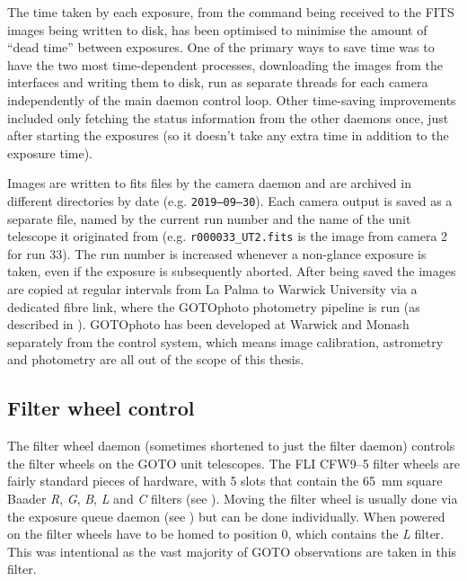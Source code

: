 \begin{colsection}
\begin{colsection}
The time taken by each exposure, from the command being received to the FITS images being written to disk, has been optimised to minimise the amount of ``dead time'' between exposures. One of the primary ways to save time was to have the two most time-dependent processes, downloading the images from the interfaces and writing them to disk, run as separate threads for each camera independently of the main daemon control loop. Other time-saving improvements included only fetching the status information from the other daemons once, just after starting the exposures (so it doesn't take any extra time in addition to the exposure time).

Images are written to \gls{fits} files by the camera daemon and are archived in different directories by date (e.g. \texttt{2019--09--30}). Each camera output is saved as a separate file, named by the current run number and the name of the unit telescope it originated from (e.g. \texttt{r000033\_UT2.fits} is the image from camera 2 for run 33). The run number is increased whenever a non-glance exposure is taken, even if the exposure is subsequently aborted. After being saved the images are copied at regular intervals from La Palma to Warwick University via a dedicated fibre link, where the GOTOphoto photometry pipeline is run (as described in ). GOTOphoto has been developed at Warwick and Monash separately from the control system, which means image calibration, astrometry and photometry are all out of the scope of this thesis.

\end{colsection}


\subsection{Filter wheel control}
\label{sec:filt}
\begin{colsection}

The filter wheel daemon (sometimes shortened to just the filter daemon) controls the filter wheels on the GOTO unit telescopes. The FLI CFW9--5 filter wheels are fairly standard pieces of hardware, with 5 slots that contain the \SI{65}{\milli\metre} square Baader \textit{R}, \textit{G}, \textit{B}, \textit{L} and \textit{C} filters (see ). Moving the filter wheel is usually done via the exposure queue daemon (see ) but can be done individually. When powered on the filter wheels have to be homed to position 0, which contains the \textit{L} filter. This was intentional as the vast majority of GOTO observations are taken in this filter.


\end{colsection}
\end{colsection}
